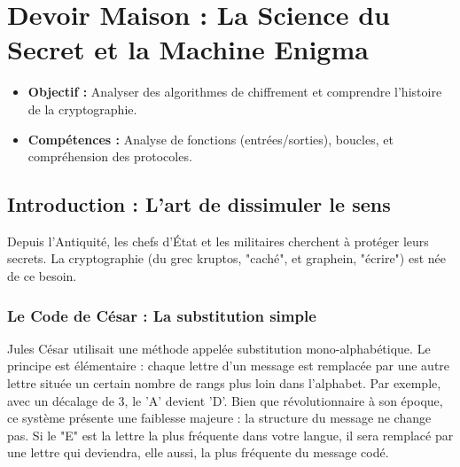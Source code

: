 \section*{Devoir Maison : La Science du Secret et la Machine Enigma}
\setcounter{section}{1}

\begin{itemize}
    \item \textbf{Objectif :} Analyser des algorithmes de chiffrement et comprendre l'histoire de la cryptographie.
    \item \textbf{Compétences :} Analyse de fonctions (entrées/sorties), boucles, et compréhension des protocoles.
\end{itemize}

\subsection*{Introduction : L’art de dissimuler le sens}

Depuis l'Antiquité, les chefs d'État et les militaires cherchent à protéger leurs secrets. La cryptographie (du grec kruptos, "caché", et graphein, "écrire") est née de ce besoin.
\subsubsection*{Le Code de César : La substitution simple}

Jules César utilisait une méthode appelée substitution mono-alphabétique. Le principe est élémentaire : chaque lettre d'un message est remplacée par une autre lettre située un certain nombre de rangs plus loin dans l'alphabet. Par exemple, avec un décalage de 3, le 'A' devient 'D'. Bien que révolutionnaire à son époque, ce système présente une faiblesse majeure : la structure du message ne change pas. Si le "E" est la lettre la plus fréquente dans votre langue, il sera remplacé par une lettre qui deviendra, elle aussi, la plus fréquente du message codé.

